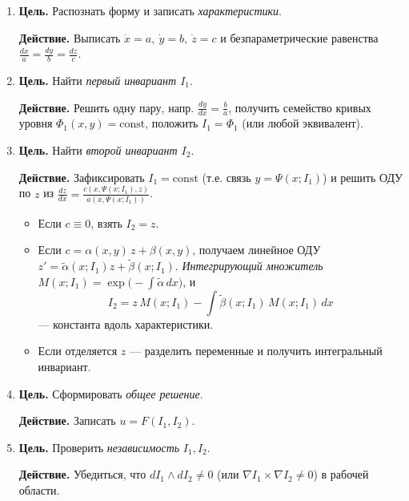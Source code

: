 \begin{enumerate}
\item \textbf{Цель.} Распознать форму и записать \emph{характеристики}.

    \textbf{Действие.} Выписать $\dot x=a,\ \dot y=b,\ \dot z=c$ и безпараметрические равенства
    $\displaystyle \frac{dx}{a}=\frac{dy}{b}=\frac{dz}{c}$.

\item \textbf{Цель.} Найти \emph{первый инвариант $I_1$}.

    \textbf{Действие.} Решить одну пару, напр. $\displaystyle \frac{dy}{dx}=\frac{b}{a}$, получить семейство кривых уровня
    $\Phi_1(x,y)=\text{const}$, положить $I_1=\Phi_1$ (или любой эквивалент).

\item \textbf{Цель.} Найти \emph{второй инвариант $I_2$}.

    \textbf{Действие.} Зафиксировать $I_1=\text{const}$ (т.е. связь $y=\Psi(x;I_1)$) и решить ОДУ по $z$ из
    $\displaystyle \frac{dz}{dx}=\frac{c(x,\Psi(x;I_1),z)}{a(x,\Psi(x;I_1))}$.
    \begin{itemize}
    \item Если $c\equiv 0$, взять $I_2=z$.
    \item Если $c=\alpha(x,y)\,z+\beta(x,y)$, получаем линейное ОДУ $z'=\tilde{\alpha}(x;I_1)z+\tilde{\beta}(x;I_1)$.
    \emph{Интегрирующий множитель} $M(x;I_1)=\exp\!\big(-\int \tilde{\alpha}\,dx\big)$, и
    \[
    \boxed{\,I_2 = z\,M(x;I_1) - \int \tilde{\beta}(x;I_1)\,M(x;I_1)\,dx\,}
    \]
    — константа вдоль характеристики.
    \item Если отделяется $z$ — разделить переменные и получить интегральный инвариант.
    \end{itemize}

\item \textbf{Цель.} Сформировать \emph{общее решение}.

    \textbf{Действие.} Записать $u=F(I_1,I_2)$.

\item \textbf{Цель.} Проверить \emph{независимость} $I_1,I_2$.

    \textbf{Действие.} Убедиться, что $dI_1\wedge dI_2\neq 0$ (или $\nabla I_1\times \nabla I_2\neq 0$) в рабочей области.
\end{enumerate}
